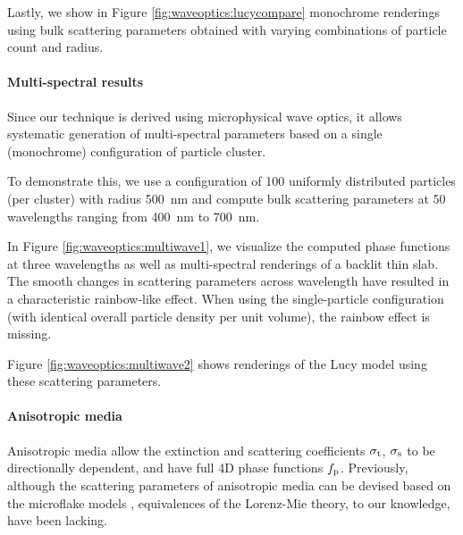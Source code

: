 Lastly, we show in Figure \ref{fig:waveoptics:lucycompare} monochrome renderings using bulk scattering parameters obtained with varying combinations of particle count and radius.



\paragraph{Multi-spectral results}

Since our technique is derived using microphysical wave optics, it allows systematic generation of multi-spectral parameters based on a single (monochrome) configuration of particle cluster.

To demonstrate this, we use a configuration of 100 uniformly distributed particles (per cluster) with radius 500~nm and compute bulk scattering parameters at 50 wavelengths ranging from 400~nm to 700~nm.





In Figure \ref{fig:waveoptics:multiwave1}, we visualize the computed phase functions at three wavelengths as well as multi-spectral renderings of a backlit thin slab.
The smooth changes in scattering parameters across wavelength have resulted in a characteristic rainbow-like effect.
When using the single-particle configuration (with identical overall particle density per unit volume), the rainbow effect is missing.

Figure \ref{fig:waveoptics:multiwave2} shows renderings of the Lucy model using these scattering parameters.


\paragraph{Anisotropic media}

Anisotropic media allow the extinction and scattering coefficients $\sigma_\mathrm{t}$, $\sigma_\mathrm{s}$ to be directionally dependent, and have full 4D phase functions $f_\mathrm{p}$.
Previously, although the scattering parameters of anisotropic media can be devised based on the microflake models \cite{jakob2010radiative,heitz2015sggx}, equivalences of the Lorenz-Mie theory, to our knowledge, have been lacking. 



